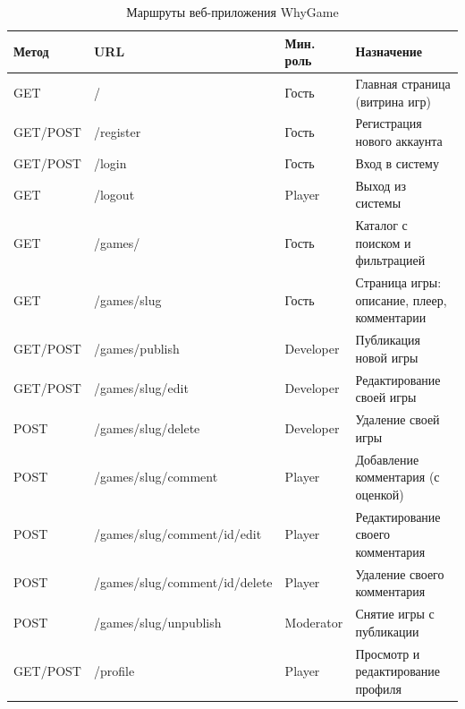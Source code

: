 \begin{table}[ht!]
    \centering
    \caption{Маршруты веб-приложения WhyGame}
    \label{tab:routes}
    \small
    \begin{tabularx}{\textwidth}{|p{1.4cm}|p{4.8cm}|p{2.3cm}|X|}
        \hline
        \textbf{Метод} & \textbf{URL} & \textbf{Мин. роль} & \textbf{Назначение} \\ \hline
        GET      & /                                  & Гость        & Главная страница (витрина игр) \\ \hline
        GET/POST & /register                          & Гость        & Регистрация нового аккаунта \\ \hline
        GET/POST & /login                             & Гость        & Вход в систему \\ \hline
        GET      & /logout                            & Player       & Выход из системы \\ \hline
        GET      & /games/                            & Гость        & Каталог с поиском и фильтрацией \\ \hline
        GET      & /games/\textlangle{}slug\textrangle{}             & Гость        & Страница игры: описание, плеер, комментарии \\ \hline
        GET/POST & /games/publish                     & Developer    & Публикация новой игры \\ \hline
        GET/POST & /games/\textlangle{}slug\textrangle{}/edit        & Developer    & Редактирование своей игры \\ \hline
        POST     & /games/\textlangle{}slug\textrangle{}/delete      & Developer    & Удаление своей игры \\ \hline
        POST     & /games/\textlangle{}slug\textrangle{}/comment     & Player       & Добавление комментария (с оценкой) \\ \hline
        POST     & /games/\textlangle{}slug\textrangle{}/comment/\textlangle{}id\textrangle{}/edit   & Player & Редактирование своего комментария \\ \hline
        POST     & /games/\textlangle{}slug\textrangle{}/comment/\textlangle{}id\textrangle{}/delete & Player & Удаление своего комментария \\ \hline
        POST     & /games/\textlangle{}slug\textrangle{}/unpublish   & Moderator    & Снятие игры с публикации \\ \hline
        GET/POST & /profile                           & Player       & Просмотр и редактирование профиля \\ \hline

\end{tabularx}
\end{table}
